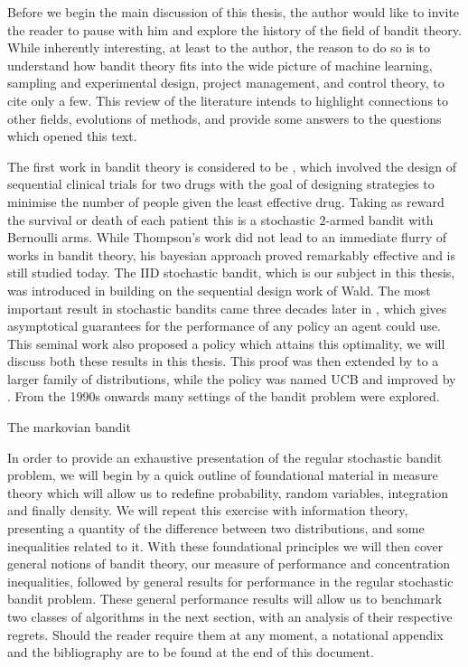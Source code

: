 \par Before we begin the main discussion of this thesis, the author would like to invite the reader to pause with him and explore the history of the field of bandit theory. While inherently interesting, at least to the author, the reason to do so is to understand how bandit theory fits into the wide picture of machine learning, sampling and experimental design, project management, and control theory, to cite only a few. This review of the literature intends to highlight connections to other fields, evolutions of methods, and provide some answers to the questions which opened this text. 

\par The first work in bandit theory is considered to be \citet{thompson:1933}, which involved the design of sequential clinical trials for two drugs with the goal of designing strategies to minimise the number of people given the least effective drug. Taking as reward the survival or death of each patient this is a stochastic $2$-armed bandit with Bernoulli arms. While Thompson's work did not lead to an immediate flurry of works in bandit theory, his bayesian approach proved remarkably effective and is still studied today\cite{agrawal:2012}. 
The IID stochastic bandit, which is our subject in this thesis, was introduced in \citet{robbins:1952} building on the sequential design work of Wald. The most important result in stochastic bandits came three decades later in \citet{lai-robbins:1985}, which gives asymptotical guarantees for the performance of any policy an agent could use. This seminal work also proposed a policy which attains this optimality, we will discuss both these results in this thesis. This proof was then extended by \citet{burnetas:1996} to a larger family of distributions, while the policy was named UCB and improved by \citet{auer:2002}. From the 1990s onwards many settings of the bandit problem were explored. 

\par The markovian bandit 



\par In order to provide an exhaustive presentation of the regular stochastic bandit problem, we will begin by a quick outline of foundational material in measure theory which will allow us to redefine probability, random variables, integration and finally density. We will repeat this exercise with information theory, presenting a quantity of the difference between two distributions, and some inequalities related to it. With these foundational principles we will then cover general notions of bandit theory, our measure of performance and concentration inequalities, followed by general results for performance in the regular stochastic bandit problem. These general performance results will allow us to benchmark two classes of algorithms in the next section, with an analysis of their respective regrets.  Should the reader require them at any moment, a notational appendix and the bibliography are to be found at the end of this document. 



